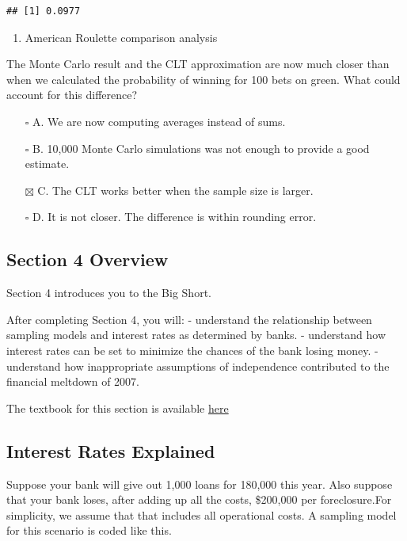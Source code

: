 \documentclass[
]{article}
\providecommand{\tightlist}{%
  \setlength{\itemsep}{0pt}\setlength{\parskip}{0pt}}
\begin{document}
\begin{verbatim}
## [1] 0.0977
\end{verbatim}

\begin{enumerate}
\def\labelenumi{\arabic{enumi}.}
\setcounter{enumi}{10}
\tightlist
\item
  American Roulette comparison analysis
\end{enumerate}

The Monte Carlo result and the CLT approximation are now much closer
than when we calculated the probability of winning for 100 bets on
green. What could account for this difference?

\begin{itemize}
\tightlist
\item[$\square$]
  A. We are now computing averages instead of sums.
\item[$\square$]
  B. 10,000 Monte Carlo simulations was not enough to provide a good
  estimate.
\item[$\boxtimes$]
  C. The CLT works better when the sample size is larger.
\item[$\square$]
  D. It is not closer. The difference is within rounding error.
\end{itemize}

\hypertarget{section-4-overview}{%
\subsection{Section 4 Overview}\label{section-4-overview}}

Section 4 introduces you to the Big Short.

After completing Section 4, you will: - understand the relationship
between sampling models and interest rates as determined by banks. -
understand how interest rates can be set to minimize the chances of the
bank losing money. - understand how inappropriate assumptions of
independence contributed to the financial meltdown of 2007.

The textbook for this section is available
\href{https://rafalab.github.io/dsbook/random-variables.html\#case-study-the-big-short}{here}

\hypertarget{interest-rates-explained}{%
\subsection{Interest Rates Explained}\label{interest-rates-explained}}

Suppose your bank will give out 1,000 loans for 180,000 this year. Also
suppose that your bank loses, after adding up all the costs, \$200,000
per foreclosure.For simplicity, we assume that that includes all
operational costs. A sampling model for this scenario is coded like
this.
\end{document}
